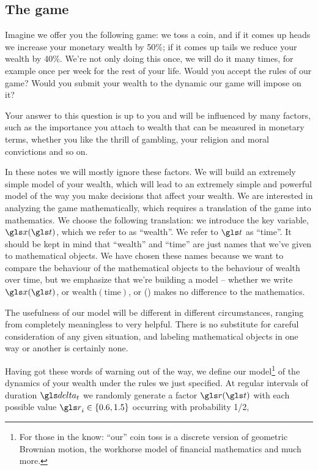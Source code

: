 \subsection{The game}
Imagine we offer you the following game: we toss a coin, and if it comes 
up heads we increase your monetary wealth by 50\%; if 
it comes up tails we reduce your wealth by 40\%. We're not only 
doing this once, we will do it many times, for example 
once per week for the rest of your life. Would you accept 
the rules of our game? Would you submit your wealth to 
the dynamic our game will impose on it?

Your answer to this question is up to you and will be 
influenced by many factors, such as the importance 
you attach to wealth that can be measured in monetary 
terms, whether you like the thrill of gambling, your 
religion and moral convictions and so on.

In these notes we will mostly ignore these factors.
We will build an extremely simple model of your 
wealth, which will lead to an extremely simple and 
powerful model of the way you make decisions that affect 
your wealth. We are interested in analyzing the 
game mathematically, which requires a translation 
of the game into mathematics. We choose the 
following translation: we introduce the key 
variable, $\x(\t)$, which we refer to as ``wealth''. 
We refer to $\t$ as ``time''. It should be kept in mind that
``wealth'' and ``time'' are just names that we've given to 
mathematical objects. We have chosen these names because
we want to compare the behaviour of the mathematical
objects to the behaviour of wealth over time, but
we emphasize that we're building a model -- whether we write $\x(\t)$, 
or $\text{wealth}(\text{time})$, or \smiley(\lightning) makes no difference to the mathematics. 

The usefulness of our model will be different in different circumstances, 
ranging from completely meaningless to very helpful. There is no 
substitute for careful consideration of any given situation, and
labeling mathematical objects in one way or another is certainly none.

Having got these words of warning out of the way, we define our 
model\footnote{For those in the know: ``our'' coin toss is a discrete version of geometric Brownian motion, the workhorse model of financial mathematics and much more.} of the dynamics of your wealth under the rules we just specified. 
At regular intervals of duration $\dt$ we randomly generate a 
factor $\gr(\t)$ with each possible value
$\gr_i\in \{0.6, 1.5\}$ occurring with probability 1/2, 

